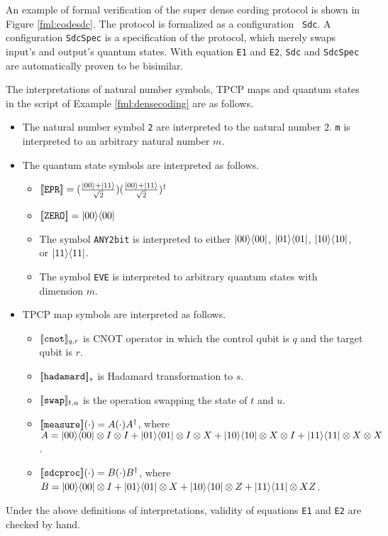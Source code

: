\begin{ex}
\label{fml:densecoding}
 An example of formal verification of the super dense cording protocol is
 shown in Figure \ref{fml:codesdc}.
 The protocol is formalized as a configuration {\tt
 Sdc}. A configuration {\tt SdcSpec} is a specification of the protocol,
 which merely swaps input's and output's quantum states.
 With equation {\tt E1} and {\tt E2}, {\tt Sdc} and {\tt SdcSpec} are
 automatically proven to be bisimilar.
\end{ex}
The interpretations of natural number symbols, TPCP maps and
quantum states in the script of Example \ref{fml:densecoding} are as follows.
\begin{itemize}
\item The natural number symbol {\tt 2} are interpreted to the
      natural number $2$.
      {\tt m} is interpreted to an arbitrary natural number $m$.
\item The quantum state symbols are interpreted as follows.
      \begin{itemize}
       \item $[\![\mathtt{EPR}]\!] = (\frac{|00\rangle+|11\rangle}{\sqrt{2}})
	     (\frac{|00\rangle+|11\rangle}{\sqrt{2}})^\dagger$
       \item $[\![\mathtt{ZERO}]\!] = |00\rangle\langle 00|$
       \item The symbol {\tt ANY2bit} is interpreted to either
	     $|00\rangle\langle 00|$, $|01\rangle\langle 01|$,
	     $|10\rangle\langle 10|$, or $|11\rangle\langle 11|$.
       \item The symbol {\tt EVE} is interpreted to arbitrary quantum
	     states with dimension $m$.
      \end{itemize}
\item TPCP map symbols 
      are interpreted as follows.
      \begin{itemize}
       \item $[\![\texttt{cnot}]\!]_{q,r}$ is CNOT operator
	     in which the control qubit is $q$ and the target qubit
	     is $r$.
       \item $[\![\texttt{hadamard}]\!]_s$ is Hadamard
	     transformation to $s$.
       \item $[\![\texttt{swap}]\!]_{t,u}$ is the operation
	     swapping the state of $t$ and $u$.
       \item $[\![\texttt{measure}]\!](\cdot) = A(\cdot)A^\dagger$,
	     where $A = |00\rangle\langle 00|\otimes I \otimes
	     I + |01\rangle\langle 01| \otimes I \otimes X + 
	     |10\rangle\langle 10| \otimes X \otimes I + |11\rangle\langle 11|
	     \otimes X \otimes X$.     
       \item $[\![\texttt{sdcproc}]\!](\cdot) = B(\cdot)B^\dagger$,
	     where $B = |00\rangle\langle 00|\otimes I +
	     |01\rangle\langle 01| \otimes X + 
	     |10\rangle\langle 10| \otimes Z + |11\rangle\langle 11| \otimes XZ$.
      \end{itemize}
\end{itemize}
Under the above definitions of interpretations, 
validity of equations {\tt E1} and {\tt E2} are checked by hand. 

